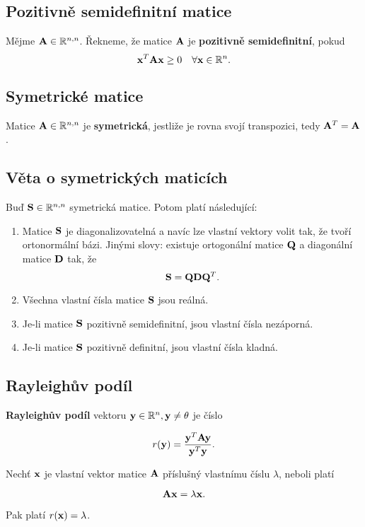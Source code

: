 \subsection*{Pozitivně semidefinitní matice}

Mějme $\mathbf{A} \in \mathbb{R}^{n,n}$. Řekneme, že matice $\mathbf{A}$ je \textbf{pozitivně
	semidefinitní}, pokud
\[ \mathbf{x}^T \mathbf{A} \mathbf{x} \geq 0 \quad \forall \mathbf{x} \in \mathbb{R}^{n}. \]

\subsection*{Symetrické matice}

Matice $\mathbf{A} \in \mathbb{R}^{n,n}$ je \textbf{symetrická}, jestliže je rovna svojí
transpozici, tedy $\mathbf{A}^T = \mathbf{A}$.

\subsection*{Věta o symetrických maticích}

Buď $\mathbf{S} \in \mathbb{R}^{n,n}$ symetrická matice. Potom platí následující:
\begin{enumerate}
	\item Matice $\mathbf{S}$ je diagonalizovatelná a navíc lze vlastní vektory volit tak, že
	      tvoří ortonormální bázi. Jinými slovy: existuje ortogonální matice $\mathbf{Q}$ a
	      diagonální matice $\mathbf{D}$ tak, že
	      \[ \mathbf{S} = \mathbf{Q}\mathbf{D}\mathbf{Q}^T. \]
	\item Všechna vlastní čísla matice $\mathbf{S}$ jsou reálná.
	\item Je-li matice $\mathbf{S}$ pozitivně semidefinitní, jsou vlastní čísla nezáporná.
	\item Je-li matice $\mathbf{S}$ pozitivně definitní, jsou vlastní čísla kladná.
\end{enumerate}

\subsection*{Rayleighův podíl}

\textbf{Rayleighův podíl} vektoru $\mathbf{y} \in \mathbb{R}^{n}, \mathbf{y} \ne \theta$ je číslo

\[ r(\mathbf{y}) = \frac{\mathbf{y}^T \mathbf{A} \mathbf{y}}{\mathbf{y}^T\mathbf{y}}. \]

\noindent Nechť $\mathbf{x}$ je vlastní vektor matice $\mathbf{A}$ příslušný vlastnímu číslu $\lambda$,
neboli platí

\[ \mathbf{A} \mathbf{x} = \lambda \mathbf{x}. \]

\noindent Pak platí $r(\mathbf{x}) = \lambda$.

